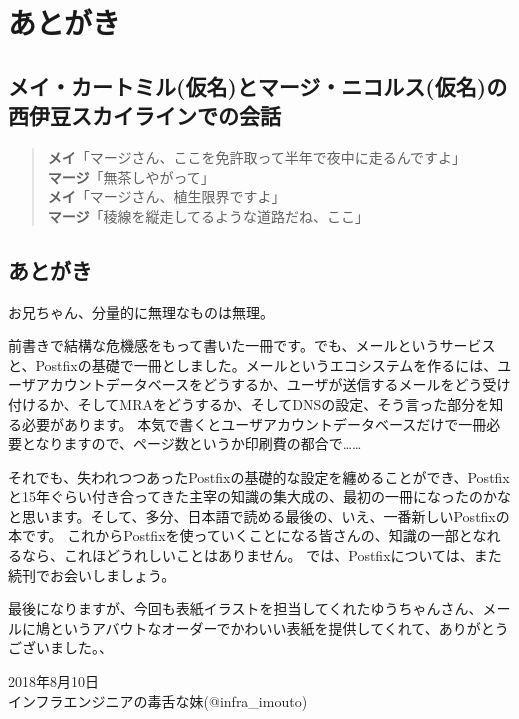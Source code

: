 \chapter{あとがき}

\section*{メイ・カートミル(仮名)とマージ・ニコルス(仮名)の西伊豆スカイラインでの会話}

\begin{quotation}
\noindent
{\bf メイ}「マージさん、ここを免許取って半年で夜中に走るんですよ」\\
{\bf マージ}「無茶しやがって」 \\
{\bf メイ}「マージさん、植生限界ですよ」 \\
{\bf マージ}「稜線を縦走してるような道路だね、ここ」 \\
\end{quotation}

\section*{あとがき}

お兄ちゃん、分量的に無理なものは無理。

前書きで結構な危機感をもって書いた一冊です。でも、メールというサービスと、Postfixの基礎で一冊としました。メールというエコシステムを作るには、ユーザアカウントデータベースをどうするか、ユーザが送信するメールをどう受け付けるか、そしてMRAをどうするか、そしてDNSの設定、そう言った部分を知る必要があります。
本気で書くとユーザアカウントデータベースだけで一冊必要となりますので、ページ数というか印刷費の都合で……

それでも、失われつつあったPostfixの基礎的な設定を纏めることができ、Postfixと15年ぐらい付き合ってきた主宰の知識の集大成の、最初の一冊になったのかなと思います。そして、多分、日本語で読める最後の、いえ、一番新しいPostfixの本です。
これからPostfixを使っていくことになる皆さんの、知識の一部となれるなら、これほどうれしいことはありません。
では、Postfixについては、また続刊でお会いしましょう。

最後になりますが、今回も表紙イラストを担当してくれたゆうちゃんさん、メールに鳩というアバウトなオーダーでかわいい表紙を提供してくれて、ありがとうございました。、

\begin{flushright}
2018年8月10日 \\
インフラエンジニアの毒舌な妹(@infra\_imouto)
\end{flushright}

